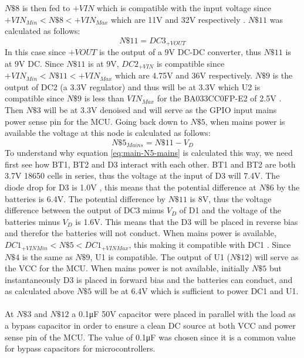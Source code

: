 $N\$8$ is then fed to $+VIN$ which is compatible with the input voltage since $+VIN_{Min} < N\$8 < +VIN_{Max}$ which are 11\si{\V} and 32\si{\V} respectively \cite{R78W900}.
$N\$11$ was calculated as follows:
\begin{equation}
  N\$11 = DC3_{+VOUT}
  \label{eq:main-N11}
\end{equation}
In this case since $+VOUT$ is the output of a 9\si{\V} DC-DC converter, thus $N\$11$ is at 9\si{V} DC. Since $N\$11$ is at 9\si{V}, $DC2_{+VIN}$ is compatible since $+VIN_{Min} < N\$11 < +VIN_{Max}$ which are 4.75\si{\V} and 36\si{\V} respectively. $N\$9$ is the output of DC2 (a 3.3\si{\V} regulator) and thus will be at 3.3\si{\V} which U2 is compatible since $N\$9$ is less than $VIN_{Max}$ for the BA033CC0FP-E2 of 2.5\si{\V} \cite{BA033CC0FPE2}. Then $N\$3$ will be at 3.3\si{\V} denoised and will serve as the GPIO input mains power sense pin for the MCU.
Going back down to $N\$5$, when mains power is available the voltage at this node is calculated as follows:
\begin{equation}
  N\$5_{Mains} = N\$11 - V_{D}
  \label{eq:main-N5-mains}
\end{equation}
To understand why equation \ref{eq:main-N5-mains} is calculated this way, we need first see how BT1, BT2 and D3 interact with each other. BT1 and BT2 are both 3.7\si{\V} 18650 cells \cite{ICR186502200F} in series, thus the voltage at the input of D3 will 7.4\si{\V}. The diode drop for D3 is 1.0\si{\V} \cite{1N4004}, this means that the potential difference at $N\$6$ by the batteries is 6.4\si{\V}. The potential difference by $N\$11$ is 8\si{\V}, thus the voltage difference between the output of DC3 minus $V_{D}$ of D1 and the voltage of the batteries minus $V_{D}$ is 1.6\si{\V}. This means that the D3 will be placed in reverse bias and therefor the batteries will not conduct. When mains power is available, $DC1_{+VINMin} < N\$5 < DC1_{+VINMax}$, this making it compatible with DC1 \cite{K7803500R3}. Since $N\$4$ is the same as $N\$9$, U1 is compatible. The output of U1 ($N\$12$) will serve as the VCC for the MCU.
When mains power is not available, initially $N\$5$ but instantaneously D3 is placed in forward bias and the batteries can conduct, and as calculated above $N\$5$ will be at 6.4\si{\V} which is sufficient to power DC1 and U1.\\\\
At $N\$3$ and $N\$12$ a 0.1\si{\micro\farad} 50\si{\V} capacitor were placed in parallel with the load as a bypass capacitor in order to ensure a clean DC source at both VCC and power sense pin of the MCU. The value of 0.1\si{\micro\farad} was chosen since it is a common value for bypass capacitors for microcontrollers.
